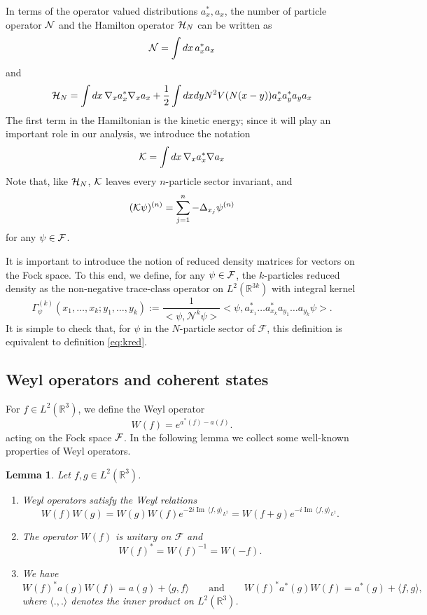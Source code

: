 \documentclass[11pt,a4paper]{article}
\newtheorem{lem}[thm]{Lemma}
\newcommand{\bR}{{\mathbb R}}
\newcommand{\cF}{{\cal F}}
\newcommand{\cK}{{\cal K}}
\newcommand{\cH}{{\cal H}}
\newcommand{\cN}{{\cal N}}
\newcommand{\R}{\mathbb{R}}
\newcommand{\fock}{\mathcal{F}}		%
\newcommand{\Ncal}{\mathcal{N}}		%
\newcommand{\scal}[2]{\big<#1,#2\big>} %
\renewcommand{\Im}{\operatorname{Im}\,} 	%
\begin{document}
In terms of the operator valued distributions $a_x^*,a_x$, the number of particle operator $\cN$ 
and the Hamilton operator $\cH_N$ can be written as
\[ \cN = \int dx \, a_x^* a_x \]
and 
\begin{equation}\label{eq:ham-F} \cH_N = \int dx \, \nabla_x a_x^* \nabla_x a_x + \frac{1}{2} \int dx dy N^2 V(N (x-y)) a^*_x a^*_y a_y a_x \end{equation}
The first term in the Hamiltonian is the kinetic energy; since it will play an important role in our analysis, we introduce the notation 
\[ \cK = \int dx \, \nabla_x a_x^* \nabla a_x \]
Note that, like $\cH_N$, $\cK$ leaves every $n$-particle sector invariant, and
\[ (\cK \psi)^{(n)} = \sum_{j=1}^n -\Delta_{x_j} \psi^{(n)} \]
for any $\psi \in \cF$. 

It is important to introduce the notion of reduced density matrices for vectors on the Fock space. To this end, we define, for any $\psi \in \cF$, the $k$-particles reduced density as the non-negative trace-class
operator on $L^2 (\bR^{3k})$ with integral kernel 
\begin{equation} \label{fock_density}
\Gamma_{\psi}^{(k)}(x_1, \dots, x_k ; y_1, \dots , y_k) := \frac{1}{\scal{\psi}{\Ncal^k \psi}} \scal{\psi}{a^*_{x_1} \dots a^*_{x_k} a_{y_1} \dots a_{y_k} \psi}.
\end{equation}
It is simple to check that, for $\psi$ in the $N$-particle sector of $\fock$, this definition is equivalent to definition \eqref{eq:kred}.

\subsection{Weyl operators and coherent states}

For $f \in L^2(\R^3)$, we define the Weyl operator 
\[
  W(f) = e^{a^*(f) - a(f)}.
\]
acting on the Fock space $\cF$. In the following lemma we collect some well-known properties of Weyl operators.
\begin{lem}\label{l:W}
  Let $f, g \in L^2(\R^3)$.
  \begin{enumerate}
    \item \label{l:W1} Weyl operators satisfy the Weyl relations
      \[
        W(f) W(g) = W(g) W(f) e^{-2i \Im \langle f, g \rangle_{L^2}} = W(f+g)
        e^{-i \Im \langle f, g \rangle_{L^2}}.
      \]
    \item \label{l:W2} The operator $W(f)$ is unitary on $\mathcal{F}$ and
      \[
        W(f)^* = W(f)^{-1} = W(-f).
      \]
    \item \label{l:W3} We have
      \begin{equation}\label{eq:W3}
        W(f)^* a (g)  W(f) = a (g) + \langle g, f \rangle  \qquad \text{and} \qquad W(f)^* a^* (g)
        W(f) = a^* (g) + \langle f, g \rangle,
      \end{equation}
      where $\langle . , . \rangle$ denotes the inner product on $L^2 (\bR^3)$. 
 \end{enumerate}
\end{lem}
\end{document}

